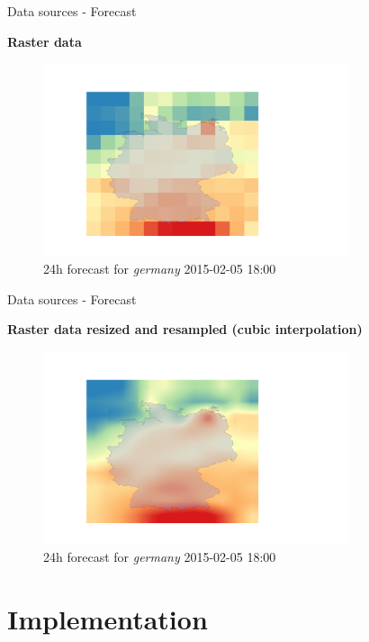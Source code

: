 \documentclass[ucs,9pt]{beamer}
\newcommand\headline[1]{%
  \par\bigskip
  {\Large\bfseries#1}\par\smallskip}
\begin{document}
\begin{frame}{Data sources - Forecast}
  \headline{Raster data}
  \begin{figure}
    \centering
    \includegraphics[width=0.8\textwidth]{images/raster_in_germany.png}
    \caption{24h forecast for \textit{germany} 2015-02-05 18:00}
    \label{fig:voronoi}
  \end{figure}
\end{frame}

\begin{frame}{Data sources - Forecast}
  \headline{Raster data \small{resized and resampled (cubic interpolation)}}
  \begin{figure}
    \centering
    \includegraphics[width=0.8\textwidth]{images/raster_in_germany_resampled.png}
    \caption{24h forecast for \textit{germany} 2015-02-05 18:00}
    \label{fig:voronoi}
  \end{figure}
\end{frame}

\section{Implementation}
\end{document}
